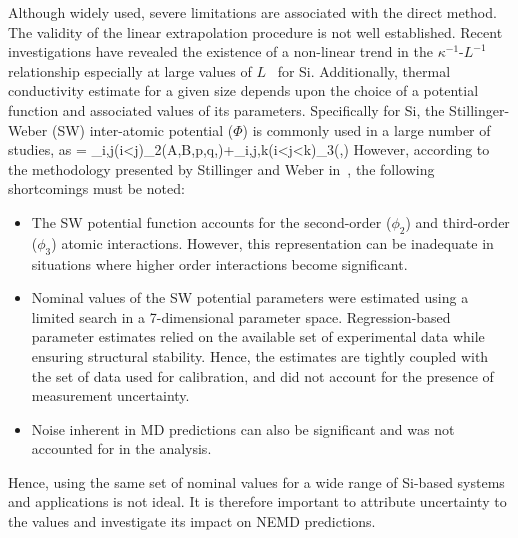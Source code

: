 Although widely used, severe limitations are associated with the direct method.
The validity of the linear extrapolation procedure is not well established. Recent
investigations have revealed the existence of a non-linear trend in the $\kappa^{-1}$-$L^{-1}$
relationship especially at large values of $L$~\cite{Sellan:2010} for Si. Additionally, 
thermal conductivity estimate for a given size depends upon the choice of a potential
function and associated values of its parameters. Specifically for Si, the Stillinger-Weber (SW)
inter-atomic potential ($\Phi$) is commonly used in a large number of studies, as
%
\be
\Phi = \sum\limits_{i,j(i<j)}\phi_2(A,B,p,q,\alpha)\hspace{1mm}+\sum\limits_{i,j,k(i<j<k)}\phi_3(\lambda,\gamma)
\ee
%
However, according
to the methodology presented by Stillinger and Weber in~\cite{Stillinger:1985},
the following shortcomings must be noted:
%
\begin{itemize}
\item The SW potential function accounts for the second-order ($\phi_2$) and
third-order ($\phi_3$) atomic 
interactions. However, this representation can be inadequate in situations where 
higher order interactions become significant.  
\item Nominal values of the SW potential parameters were estimated using a 
limited search in a 7-dimensional parameter space. Regression-based parameter
estimates relied on the available set of experimental data while ensuring structural
stability. Hence, the estimates are tightly coupled with the set of data used for
calibration, and did not account for the presence of measurement uncertainty. 
\item Noise inherent in MD predictions can also be significant and
was not accounted for in the analysis. 
\end{itemize}
%
Hence, using the same set of nominal values for a wide range of Si-based systems and
applications is not ideal. It is therefore important to attribute uncertainty to the values and
investigate its impact on NEMD predictions. 

